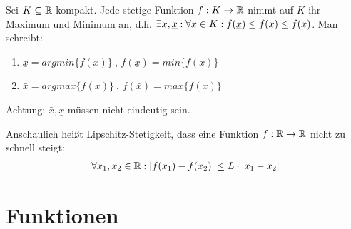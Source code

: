 \begin{satz}
	Sei $K \subseteq \mathbb{R}$ kompakt. Jede stetige Funktion $f : K \rightarrow \mathbb{R}$ nimmt auf $K$ ihr Maximum und Minimum an, d.h. $\exists \bar{x}, \underline{x}: \forall x \in K : f(\underline{x}) \leq f(x) \leq f(\bar{x})$. Man schreibt:
	
	\begin{enumerate}[noitemsep]
		\item $\underline{x} = argmin \{ f(x) \} \medspace$, $f(\underline{x}) = min \{f(x)\}$
		\item $\bar{x} = argmax \{ f(x) \} \medspace$, $f(\bar{x}) = max \{f(x)\}$
	\end{enumerate}

	Achtung: $\bar{x}, \underline{x}$ müssen nicht eindeutig sein.
\end{satz}

\begin{definition}
	Anschaulich heißt Lipschitz-Stetigkeit, dass eine Funktion $f : \mathbb{R} \rightarrow \mathbb{R}$ nicht zu schnell steigt:
	\begin{align*}
		\forall x_1, x_2 \in \mathbb{R} : |f(x_1) - f(x_2)| \leq L \cdot |x_1 - x_2|
	\end{align*}
\end{definition}
	
\section{Funktionen}

